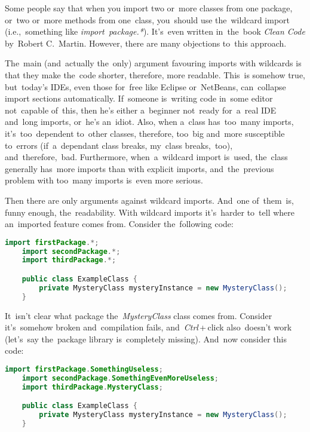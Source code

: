 \label{javagenerics}

\label{javathread}

\label{javathreadsafety}


\label{reflection}

Some people say that when you import two or~more classes from one package, or~two or~more methods from one~class, you~should use the~wildcard import (i.e.,~something like \textit{import~package.*}).
It's~even written in~the~book \textit{Clean Code} by~Robert C.~Martin.
However, there are many objections to~this approach.

The~main (and~actually the~only) argument favouring imports with wildcards is that they make the~code shorter, therefore, more readable.
This~is somehow true, but~today's IDEs, even those for~free like Eclipse or~NetBeans, can~collapse import sections automatically.
If~someone is~writing code in~some editor not~capable of~this, then he's either a~beginner not~ready for~a~real IDE and~long imports, or~he's an~idiot.
Also, when a~class has~too~many imports, it's~too~dependent to~other classes, therefore, too~big and~more susceptible to~errors (if~a~dependant class breaks, my~class breaks,~too), and~therefore,~bad.
Furthermore, when~a~wildcard import is~used, the~class generally has~more imports than with explicit imports, and~the~previous problem with too~many imports is~even more serious.

Then there are only arguments against wildcard imports.
And~one of~them~is, funny enough, the~readability.
With wildcard imports it's~harder to~tell where an~imported feature comes from.
Consider the~following code:
\begin{lstlisting}[language=Java]
    import firstPackage.*;
    import secondPackage.*;
    import thirdPackage.*;

    public class ExampleClass {
        private MysteryClass mysteryInstance = new MysteryClass();
    }
\end{lstlisting}

\noindent It~isn't clear what package the~\textit{MysteryClass} class comes from.
Consider it's~somehow broken and~compilation fails, and~\textit{Ctrl}\,+\,click also~doesn't work (let's~say the~package library is~completely missing).
And~now consider this code:
\begin{lstlisting}[language=Java]
    import firstPackage.SomethingUseless;
    import secondPackage.SomethingEvenMoreUseless;
    import thirdPackage.MysteryClass;

    public class ExampleClass {
        private MysteryClass mysteryInstance = new MysteryClass();
    }
\end{lstlisting}

